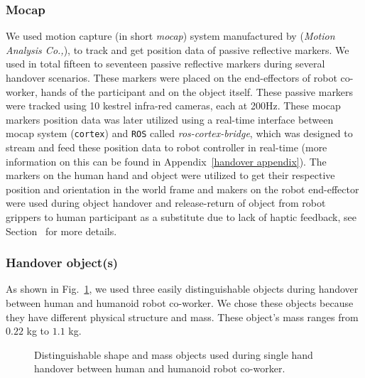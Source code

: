 \documentclass[a4paper, 12pt, oneside]{Thesis}  %
\begin{document}
\subsubsection{Mocap}
We used motion capture (in short \textit{mocap}) system manufactured by ({\it Motion Analysis Co.,}), to track and get position data of passive reflective markers. We used in total fifteen to seventeen passive reflective markers during several handover scenarios. These markers were placed on the end-effectors of robot co-worker, hands of the participant and on the object itself. These passive markers were tracked using 10 kestrel infra-red cameras, each at 200Hz. These mocap markers position data was later utilized using a real-time interface between mocap system (\texttt{cortex}) and \texttt{ROS} called \textit{ros-cortex-bridge}, which was designed to stream and feed these position data to robot controller in real-time (more information on this can be found in Appendix~\ref{handover appendix}). The markers on the human hand and object were utilized to get their respective position and orientation in the world frame and makers on the robot end-effector were used during object handover and release-return of object from robot grippers to human participant as a substitute due to lack of haptic feedback, see Section~ for more details.

\subsubsection{Handover object(s)}

As shown in Fig.~\ref{fig:objects}, we used three easily distinguishable objects during handover between human and humanoid robot co-worker. We chose these objects because they have different physical structure and mass. These object's mass ranges from $0.22$ kg to $1.1$ kg.


\begin{figure}[htpb]
	\caption{Distinguishable shape and mass objects used during single hand handover between human and humanoid robot co-worker.}
	\label{fig:objects}
\end{figure}
\end{document}
